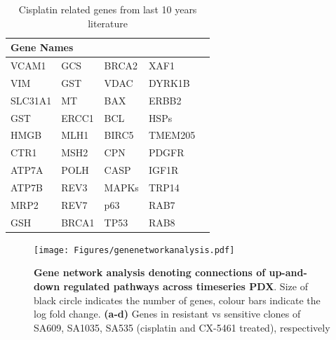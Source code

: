  \begin{table}[htbp]
   \centering
   \caption{Cisplatin related genes from last 10 years literature}
     \begin{tabular}{|l|l|l|l|r}
     
     \hline
     \multicolumn{4}{|l|}{Gene Names}  \\
     \hline
     
     VCAM1  & GCS    & BRCA2  & XAF1    \\
     VIM    & GST    & VDAC   & DYRK1B  \\
     SLC31A1 & MT     & BAX    & ERBB2 \\
     GST    & ERCC1  & BCL    & HSPs   \\
     HMGB   & MLH1   & BIRC5  & TMEM205 \\
     CTR1   & MSH2   & CPN    & PDGFR \\
     ATP7A  & POLH   & CASP   & IGF1R  \\
     ATP7B  & REV3   & MAPKs  & TRP14  \\
     MRP2   & REV7   & p63    & RAB7   \\
     GSH    & BRCA1  & TP53   & RAB8   \\
     \hline
     \end{tabular}%
   \label{tab:Cisplatinrelatedgenes}%
 \end{table}
 
 
 
\begin{figure}
\centering
  \texttt{[image: Figures/genenetworkanalysis.pdf]}
\caption[DE of resistant and sensitive clonealign defined clones]
	{\small
	\textbf{Gene network analysis denoting connections of up-and-down regulated pathways across timeseries PDX}. Size of black circle indicates the number of genes, colour bars indicate the log fold change.
	\textbf{(a-d)} Genes in resistant vs sensitive clones of SA609, SA1035, SA535 (cisplatin and CX-5461 treated), respectively}
	   	\label{fig:genenetworkanalysis}
\end{figure} 
 
 
 
 
 
 

